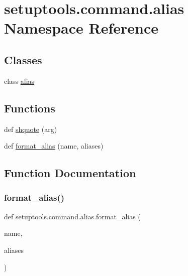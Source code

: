\hypertarget{namespacesetuptools_1_1command_1_1alias}{}\section{setuptools.\+command.\+alias Namespace Reference}
\label{namespacesetuptools_1_1command_1_1alias}
\subsection*{Classes}
\begin{DoxyCompactItemize}
\item 
class \hyperlink{classsetuptools_1_1command_1_1alias_1_1alias}{alias}
\end{DoxyCompactItemize}
\subsection*{Functions}
\begin{DoxyCompactItemize}
\item 
def \hyperlink{namespacesetuptools_1_1command_1_1alias_ab7dcb5208d78b13962adc7fe0c257e10}{shquote} (arg)
\item 
def \hyperlink{namespacesetuptools_1_1command_1_1alias_a3723fa7e97193ce0a08db94393418d25}{format\+\_\+alias} (name, aliases)
\end{DoxyCompactItemize}


\subsection{Function Documentation}
\mbox{\label{namespacesetuptools_1_1command_1_1alias_a3723fa7e97193ce0a08db94393418d25}} 
\subsubsection{\texorpdfstring{format\+\_\+alias()}{format\_alias()}}
{\footnotesize\ttfamily def setuptools.\+command.\+alias.\+format\+\_\+alias (\begin{DoxyParamCaption}\item[{}]{name,  }\item[{}]{aliases }\end{DoxyParamCaption})}

